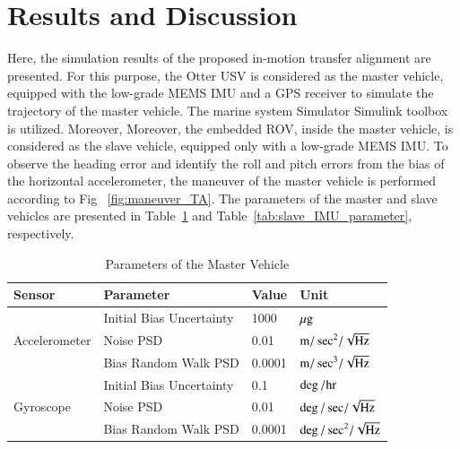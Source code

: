 \documentclass[3p]{elsarticle}
\begin{document}
\section{Results and Discussion}\label{sec:Results}
\noindent Here, the simulation results of the proposed in-motion transfer alignment are presented. For this purpose, the Otter USV is considered as the master vehicle, equipped with the low-grade MEMS IMU and a GPS receiver to simulate the trajectory of the master vehicle. The marine system Simulator Simulink toolbox~\cite{MIC-2009-1-1} is utilized. Moreover,
Moreover, the embedded ROV, inside the master vehicle, is considered as the slave vehicle, equipped only with a low-grade MEMS IMU\@.
To observe the heading error and identify the roll and pitch errors from the bias of the horizontal accelerometer, the maneuver of the master vehicle is performed  according to Fig~ \ref{fig:maneuver_TA}.
The parameters of the master and slave vehicles are presented in Table~\ref{tab:master_IMU_parameter} and Table~\ref{tab:slave_IMU_parameter}, respectively.
\begin{table}[H]
	\centering
	\caption{
		Parameters of the Master Vehicle
	}
	\begin{adjustbox}{max width=0.5\textwidth}
	\begin{tabular}{l|l|l|l}
		\hline
		\textbf{Sensor} & \textbf{Parameter} & \textbf{Value} & \textbf{Unit} \\
		\hline
		\multirow{3}{*}{Accelerometer} &  Initial Bias Uncertainty & 1000 & \(\mu \rm{g}\) \\
		& Noise PSD & 0.01 & \(\rm{m/\sec}^2/\sqrt{\rm{Hz}}\) \\
		& Bias Random Walk PSD & 0.0001 & \(\rm{m/\sec}^3/\sqrt{\rm{Hz}}\) \\
		\hline
		\multirow{3}{*}{Gyroscope} & Initial Bias Uncertainty & 0.1 & \(\rm{\deg/hr}\) \\
		 & Noise PSD & 0.01 & \({\deg/\sec}/\sqrt{\rm{Hz}}\) \\
		 & Bias Random Walk PSD & 0.0001 & \({\deg/\sec}^2/\sqrt{\rm{Hz}}\) \\
		\hline
	\end{tabular}\label{tab:master_IMU_parameter}
\end{adjustbox}
\end{table}
\end{document}
